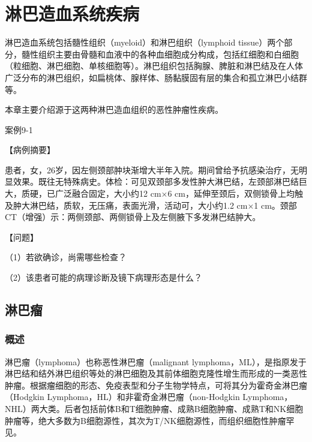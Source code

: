 \chapter{淋巴造血系统疾病}


淋巴造血系统包括髓性组织（myeloid）和淋巴组织（lymphoid
tissue）两个部分，髓性组织主要由骨髓和血液中的各种血细胞成分构成，包括红细胞和白细胞（粒细胞、淋巴细胞、单核细胞等）。淋巴组织包括胸腺、脾脏和淋巴结及在人体广泛分布的淋巴组织，如扁桃体、腺样体、肠黏膜固有层的集合和孤立淋巴小结群等。

本章主要介绍源于这两种淋巴造血组织的恶性肿瘤性疾病。

\begin{framed}
{案例9-1}

{【病例摘要】}

患者，女，26岁，因左侧颈部肿块渐增大半年入院。期间曾给予抗感染治疗，无明显效果。既往无特殊病史。体检：可见双颈部多发性肿大淋巴结，左颈部淋巴结巨大，质硬，已广泛融合固定，大小约12
cm×6
cm，延伸至颈后，双侧锁骨上均触及肿大淋巴结，质软，无压痛，表面光滑，活动可，大小约1.2
cm×1
cm。颈部CT（增强）示：两侧颈部、两侧锁骨上及左侧腋下多发淋巴结肿大。

{【问题】}

（1）若欲确诊，尚需哪些检查？

（2）该患者可能的病理诊断及镜下病理形态是什么？
\end{framed}

\section{淋巴瘤}

\subsection{概述}

淋巴瘤（lymphoma）也称恶性淋巴瘤（malignant
lymphoma，ML），是指原发于淋巴结和结外淋巴组织等处的淋巴细胞及其前体细胞克隆性增生而形成的一类恶性肿瘤。根据瘤细胞的形态、免疫表型和分子生物学特点，可将其分为霍奇金淋巴瘤（Hodgkin
Lymphoma，HL）和非霍奇金淋巴瘤（non-Hodgkin
Lymphoma，NHL）两大类。后者包括前体B和T细胞肿瘤、成熟B细胞肿瘤、成熟T和NK细胞肿瘤等，绝大多数为B细胞源性，其次为T/NK细胞源性，而组织细胞性肿瘤罕见。

